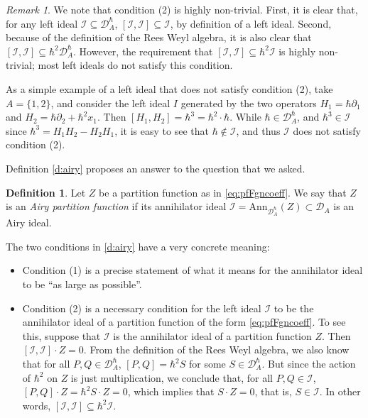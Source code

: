 \documentclass[reqno,oneside,11pt]{amsart}
\theoremstyle{plain}
\theoremstyle{definition}
\newtheorem{definition}[theorem]{Definition}
\theoremstyle{remark}
\newtheorem{remark}[theorem]{Remark}
\numberwithin{equation}{section}
\newcommand{\I}{\mathcal{I}}
\newcommand{\DA}{\mathcal{D}_A}
\newcommand{\DAh}{\mathcal{D}_A^{\hbar}}
\begin{document}
\begin{remark}
We note that condition (2) is highly non-trivial. First, it is clear that, for any left ideal $\mathcal{I} \subseteq \DAh$, $[\mathcal{I}, \mathcal{I}] \subseteq \mathcal{I}$, by definition of a left ideal. Second, because of the definition of the Rees Weyl algebra, it is also clear that $[\mathcal{I},\mathcal{I}] \subseteq \hbar^2 \DAh$. However, the requirement that $[\mathcal{I},\mathcal{I}] \subseteq \hbar^2 \mathcal{I}$ is highly non-trivial; most left ideals do not satisfy this condition.

As a simple example of a left ideal that does not satisfy condition (2), take $A = \{1,2 \}$, and consider the left ideal $I$ generated by the two operators $H_1 = \hbar \partial_1$ and $H_2 = \hbar \partial_2 + \hbar^2 x_1$. Then $[H_1, H_2] = \hbar^3 = \hbar^2 \cdot \hbar$. While $\hbar \in \DAh$, and $\hbar^3 \in \mathcal{I}$ since $\hbar^3 = H_1 H_2 - H_2 H_1$, it is easy to see that $\hbar \notin \mathcal{I}$, and thus $\mathcal{I}$ does not satisfy condition (2).
\end{remark}
 
 
 Definition \ref{d:airy} proposes an answer to the question that we asked.

 \begin{definition}\label{d:airypf}
 Let  $Z$ be a partition function as in \eqref{eq:pfFgncoeff}. We say that $Z$ is an \emph{Airy partition function} if its annihilator ideal $\mathcal{I} = \text{Ann}_{\DAh}(Z) \subset \DA$ is an Airy ideal. 
 \end{definition}
 
 The two conditions in \eqref{d:airy} have a very concrete meaning:
 \begin{itemize}
\item Condition (1) is a precise statement of what it means for the annihilator ideal to be ``as large as possible''. 
\item Condition (2) is a necessary condition for the left ideal $\mathcal{I}$ to be the annihilator ideal of a partition function of the form \eqref{eq:pfFgncoeff}. To see this, suppose that $\I$ is the annihilator ideal of a partition function $Z$. Then $[\mathcal{I}, \mathcal{I} ] \cdot Z = 0$. From the definition of the Rees Weyl algebra, we also know that for all $P,Q \in \DAh$, $[P, Q ] = \hbar^2 S$ for some $S \in \DAh$. But since the action of $\hbar^2$ on $Z$ is just multiplication, we conclude that, for all $P,Q \in \mathcal{I}$, $[P,Q]  \cdot Z = \hbar^2 S \cdot Z = 0$, which implies that $S \cdot Z = 0$, that is, $S \in \mathcal{I}$. In other words, $[ \mathcal{I}, \mathcal{I} ] \subseteq \hbar^2 \mathcal{I}$.
\end{itemize}
\end{document}
